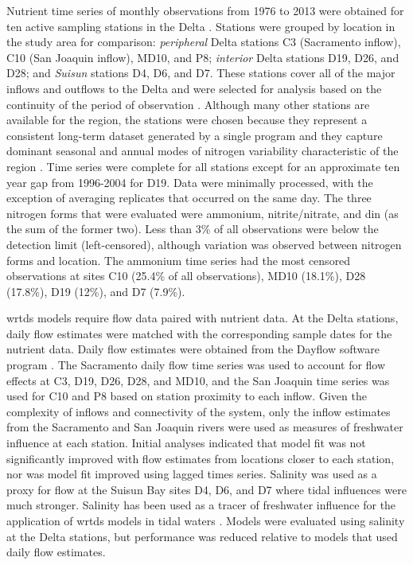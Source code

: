 \documentclass[letterpaper,12pt,oneside]{article}\usepackage[]{graphicx}\usepackage[]{color}
\begin{document}
Nutrient time series of monthly observations from 1976 to 2013 were obtained for ten active sampling stations in the Delta \citep[\cref{fig:delt_map,tab:stdescrp},][]{IEP13}.  Stations were grouped by location in the study area for comparison: \textit{peripheral} Delta stations C3 (Sacramento inflow), C10 (San Joaquin inflow), MD10, and P8; \textit{interior} Delta stations D19, D26, and D28; and \textit{Suisun} stations D4, D6, and D7.  These stations cover all of the major inflows and outflows to the Delta and were selected for analysis based on the continuity of the period of observation \citep{Jabusch09}. Although many other stations are available for the region, the stations were chosen because they represent a consistent long-term dataset generated by a single program and they capture dominant seasonal and annual modes of nitrogen variability characteristic of the region \citep{Jabusch16}. Time series were complete for all stations except for an approximate ten year gap from 1996-2004 for D19.  Data were minimally processed, with the exception of averaging replicates that occurred on the same day.  The three nitrogen forms that were evaluated were ammonium, nitrite/nitrate, and \ac{din} (as the sum of the former two). Less than 3\% of all observations were below the detection limit (left-censored), although variation was observed between nitrogen forms and location.  The ammonium time series had the most censored observations at sites C10 (25.4\% of all observations), MD10 (18.1\%), D28 (17.8\%), D19 (12\%), and D7 (7.9\%).

\ac{wrtds} models require flow data paired with nutrient data. At the Delta stations, daily flow estimates were matched with the corresponding sample dates for the nutrient data. Daily flow estimates were obtained from the Dayflow software program \citep{IEP16}.  The Sacramento daily flow time series was used to account for flow effects at C3, D19, D26, D28, and MD10, and the San Joaquin time series was used for C10 and P8 based on station proximity to each inflow. Given the complexity of inflows and connectivity of the system, only the inflow estimates from the Sacramento and San Joaquin rivers were used as measures of freshwater influence at each station.  Initial analyses indicated that model fit was not significantly improved with flow estimates from locations closer to each station, nor was model fit improved using lagged times series. Salinity was used as a proxy for flow at the Suisun Bay sites D4, D6, and D7 where tidal influences were much stronger. Salinity has been used as a tracer of freshwater influence for the application of \ac{wrtds} models in tidal waters \citep{Beck15}.  Models were evaluated using salinity at the Delta stations, but performance was reduced relative to models that used daily flow estimates. 
\end{document}
